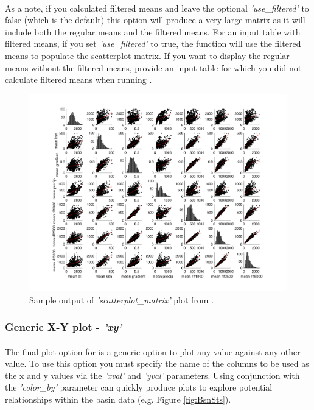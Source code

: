 \paragraph{}As a note, if you calculated filtered means and leave the optional \textit{'use\_filtered'} to false (which is the default) this option will produce a very large matrix as it will include both the regular means and the filtered means. For an input table with filtered means, if you set \textit{'use\_filtered'} to true, the function will use the filtered means to populate the scatterplot matrix. If you want to display the regular means without the filtered means, provide an input table for which you did not calculate filtered means when running .

\begin{figure}[H]
	\centering
	\includegraphics[width=16.5cm]{PNGs/ScatterPlotMatrix.png}
	\caption{Sample output of \textit{'scatterplot\_matrix'} plot from .}
	\label{fig:ScatterMatrix}
\end{figure}

\subsubsection{Generic X-Y plot - \textit{'xy'}} \label{sec:xy}
\paragraph{}The final plot option for  is a generic option to plot any value against any other value. To use this option you must specify the name of the columns to be used as the x and y values via the \textit{'xval'} and \textit{'yval'} parameters. Using conjunction with the \textit{'color\_by'} parameter can quickly produce plots to explore potential relationships within the basin data (e.g. Figure \ref{fig:BsnSts}).


